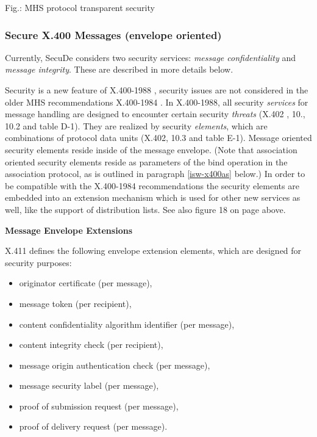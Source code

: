 \newpage
\begin{center}
\end{center}
\label{fig-isw-mhs-3}
{\footnotesize Fig.:
MHS protocol transparent security}

\subsubsection{Secure X.400 Messages (envelope oriented)}
\label{isw-x400env}

Currently, SecuDe considers two security services:
{\em message confidentiality} and {\em message integrity}.
These are described in more details below.

Security is a new feature of X.400-1988 \cite{cci2},
security issues are not considered in the older MHS recommendations
X.400-1984 \cite{cci1}.
In X.400-1988,
all security {\em services} for message handling
are designed to encounter certain security {\em threats}
(X.402 \cite{cci2}, 10., 10.2 and table D-1).
They are realized by security {\em elements}, which are
combinations of protocol data units
(X.402, 10.3 and table E-1).
Message oriented security elements reside
inside of the message envelope.
(Note that association oriented security elements
reside as parameters of the bind operation in the association protocol,
as is outlined in paragraph \ref{isw-x400as} below.)
In order to be compatible with the X.400-1984 recommendations
the security elements are embedded into an extension
mechanism which is used for other new services as well,
like the support of distribution lists.
See also figure 18 on page \pageref{fig-isw-mhs-2} above.

{\bf Message Envelope Extensions}
\label{isw-mee}

X.411 \cite{cci2}
defines the following envelope extension elements,
which are designed for security purposes:

\begin{itemize}
\item originator certificate (per message),
\item message token (per recipient),
\item content confidentiality algorithm identifier (per message),
\item content integrity check (per recipient),
\item message origin authentication check (per message),
\item message security label (per message),
\item proof of submission request (per message),
\item proof of delivery request (per message).
\end{itemize}

